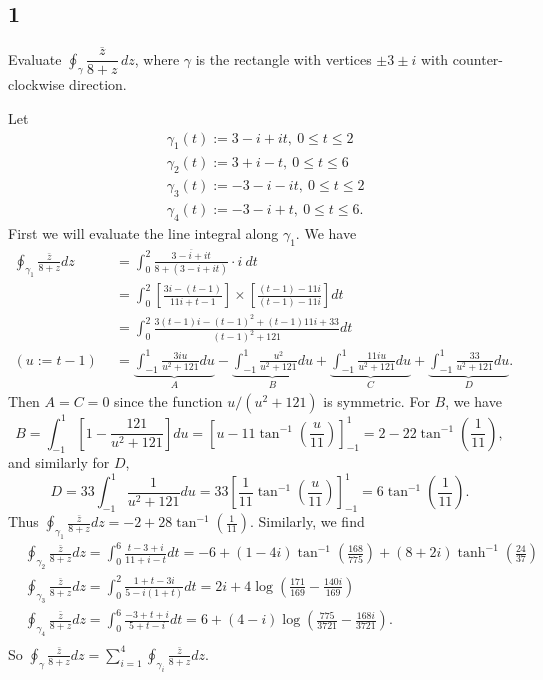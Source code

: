 \documentclass[12pt]{article}
\begin{document}
\subsection*{1}
\begin{tcolorbox}
Evaluate
$\oint_\gamma \dfrac{\overline{z}}{8+z}\,dz$, where $\gamma$ is the
rectangle with vertices $\pm 3\pm i$ with counter-clockwise
direction.
\end{tcolorbox}
Let 
\begin{align*}
& \gamma_{1}(t) := 3 - i + it, \ 0 \leq t \leq 2 \\
& \gamma_{2}(t) := 3 + i - t,  \ 0 \leq t \leq 6 \\
& \gamma_{3}(t) := -3 - i - it, \ 0 \leq t \leq 2 \\
& \gamma_{4}(t) := -3 - i + t, \ 0 \leq t \leq 6.
\end{align*}
First we will evaluate the line integral along $\gamma_{1}$. We have 
\begin{align*}
\oint_{\gamma_{1}}\frac{\bar{z}}{8 + z}dz & = \int_{0}^{2}\frac{\overline{3 - i + it}}{8 + (3-i + it)}\cdot i\  dt \\
& = \int_{0}^{2} 
\left[ \frac{3i - (t-1)}{11i + t - 1}\right]\times \left[ \frac{(t-1) - 11i}{(t-1) - 11i}\right]dt \\
& = \int_{0}^{2}\frac{3(t-1)i - (t-1)^2 + (t-1)11i + 33 }{(t-1)^{2} + 121}dt \\
(u:= t - 1)\  \ & = \underbrace{\int_{-1}^{1}\frac{3iu}{u^{2} + 121}du}_{A} - \underbrace{\int_{-1}^{1}\frac{u^{2}}{u^{2} + 121}du}_{B} + 
\underbrace{\int_{-1}^{1}\frac{11iu}{u^{2}+121}du}_{C} +
\underbrace{\int_{-1}^{1}\frac{33}{u^{2} + 121}du}_{D}.
\end{align*}
Then $A = C = 0$ since the function $u / (u^{2} + 121)$ is symmetric. For $B$, we have 
\[ B = \int_{-1}^{1}\left[ 1 - \frac{121}{u^{2} + 121}\right]du = \left[ u - 11\tan^{-1}\left( \frac{u}{11} \right)\right]_{-1}^{1}  = 2 -
22\tan^{-1}\left( \frac{1}{11} \right), \]
and similarly for $D$,
\[ D = 33 \int_{-1}^{1}\frac{1}{u^{2} + 121}du = 33\left[ \frac{1}{11}\tan^{-1}\left( \frac{u}{11} \right)\right]_{-1}^{1} = 6\tan^{-1}\left( 
\frac{1}{11}\right). \]
Thus $\oint_{\gamma_{1}}\frac{\bar{z}}{8 + z}dz = -2 + 28\tan^{-1}\left( \frac{1}{11} \right)$. Similarly, we find 
\begin{align*}
& \oint_{\gamma_{2}}\frac{\bar{z}}{8 + z}dz = \int_{0}^{6}\frac{t - 3 + i}{11 + i - t}dt = -6 + (1-4i)\tan^{-1}\left( \frac{168}{775}\right) + (8 +
2i)\tanh^{-1}\left( \frac{24}{37} \right)\\
& \oint_{\gamma_{3}}\frac{\bar{z}}{8 + z}dz = \int_{0}^{2}\frac{1 + t - 3i}{5 - i(1 + t)}dt = 2i + 4\log\left( \frac{171}{169} - \frac{140i}{169} \right) \\
& \oint_{\gamma_{4}}\frac{\bar{z}}{8 + z}dz = \int_{0}^{6}\frac{-3 + t + i}{5 + t - i}dt =  6 + (4 - i)\log\left( \frac{775}{3721} - \frac{168i}{3721}
\right).  \\
\end{align*}
So $\oint_{\gamma}\frac{\bar{z}}{8 + z}dz = \sum_{i=1}^{4}\oint_{\gamma_{i}}\frac{\bar{z}}{8 + z}dz$.
\end{document}
